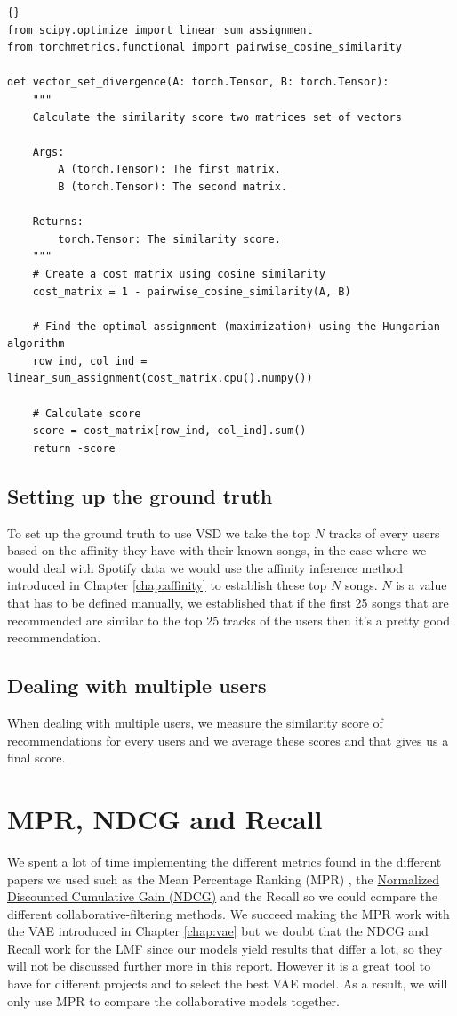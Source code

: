 \begin{lstlisting}{}
from scipy.optimize import linear_sum_assignment
from torchmetrics.functional import pairwise_cosine_similarity

def vector_set_divergence(A: torch.Tensor, B: torch.Tensor):
    """
    Calculate the similarity score two matrices set of vectors

    Args:
        A (torch.Tensor): The first matrix.
        B (torch.Tensor): The second matrix.

    Returns:
        torch.Tensor: The similarity score.
    """
    # Create a cost matrix using cosine similarity
    cost_matrix = 1 - pairwise_cosine_similarity(A, B)

    # Find the optimal assignment (maximization) using the Hungarian algorithm
    row_ind, col_ind = linear_sum_assignment(cost_matrix.cpu().numpy())

    # Calculate score
    score = cost_matrix[row_ind, col_ind].sum()
    return -score
\end{lstlisting}

\subsection{Setting up the ground truth} \label{subsec:ground_truth}
To set up the ground truth to use VSD we take the top $N$ tracks of every users based on the affinity they have with their known songs, in the case where we would deal with Spotify data we would use the affinity inference method introduced in Chapter \ref{chap:affinity} to establish these top $N$ songs. $N$ is a value that has to be defined manually, we established that if the first 25 songs that are recommended are similar to the top 25 tracks of the users then it's a pretty good recommendation.

\subsection{Dealing with multiple users}
When dealing with multiple users, we measure the similarity score of recommendations for every users and we average these scores and that gives us a final score.

\section{MPR, NDCG and Recall} \label{sec:ordered_metrics}
We spent a lot of time implementing the different metrics found in the different papers we used such as the Mean Percentage Ranking (MPR) \cite{johnson_logistic_matrix_factorization}, the \href{https://en.wikipedia.org/wiki/Discounted_cumulative_gain}{Normalized Discounted Cumulative Gain (NDCG)} and the Recall \cite{liang2018variational} so we could compare the different collaborative-filtering methods. We succeed making the MPR work with the VAE introduced in Chapter \ref{chap:vae} but we doubt that the NDCG and Recall work for the LMF since our models yield results that differ a lot, so they will not be discussed further more in this report. However it is a great tool to have for different projects and to select the best VAE model. As a result, we will only use MPR to compare the collaborative models together.

